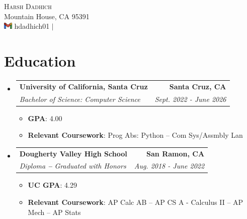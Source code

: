 \documentclass[letterpaper,11pt]{article}
\makeatletter
\newcommand{\resumeSubheading}[4]{
  \vspace{-2pt}\item
    \begin{tabular*}{1.0\textwidth}[t]{l@{\extracolsep{\fill}}r}
      \textbf{#1} & \textbf{\small #2} \\
      \textit{\small#3} & \textit{\small #4} \\
    \end{tabular*}\vspace{-7pt}
}
\newcommand{\resumeSubHeadingListStart}{\begin{itemize}[leftmargin=0.0in, label={}]}
\newcommand{\resumeSubHeadingListEnd}{\end{itemize}}
\makeatother
\begin{document}

\begin{center}
  {\Huge \scshape Harsh Dadhich} \\ \vspace{1pt}
  Mountain House, CA 95391 \\ \vspace{1pt}
  \href{mailto:hdadhich01@gmail.com}{\includegraphics[height=9pt]{google-mail.png}} \href{https://linkedin.com/in/hdadhich01}{\faLinkedin} \href{https://github.com/hdadhich01}{\faGithub} hdadhich01 $|$ \href{tel:+12096371007}{\small \raisebox{-0.1\height}}
  \vspace{-15pt}
\end{center}

\section{Education}
\resumeSubHeadingListStart
\resumeSubheading
{University of California, Santa Cruz}{Santa Cruz, CA}
{Bachelor of Science: Computer Science}{Sept. 2022 - June 2026}
\begin{itemize}[itemsep=-1pt, parsep=1pt]
  \item\small \textbf{GPA}{: 4.00}
  \item \textbf{Relevant Coursework}{: Prog Abs: Python -- Com Sys/Assmbly Lan}
\end{itemize}
\resumeSubheading
{Dougherty Valley High School}{San Ramon, CA}
{Diploma \textbf{--} Graduated with Honors}{Aug. 2018 - June 2022}
\begin{itemize}[itemsep=-1pt, parsep=1pt]
  \item\small \textbf{UC GPA}{: 4.29}
  \item \textbf{Relevant Coursework}{: AP Calc AB -- AP CS A - Calculus II -- AP Mech -- AP Stats}
\end{itemize}
\resumeSubHeadingListEnd
\vspace{-15pt}
\end{document}
